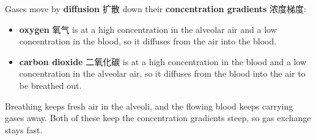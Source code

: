 \documentclass[11pt]{article}
\begin{document}
Gases move by \textbf{diffusion} 扩散 down their \textbf{concentration gradients} 浓度梯度:

\begin{itemize}
\item \textbf{oxygen} 氧气 is at a high concentration in the alveolar air and a low concentration in the blood, so it diffuses from the air into the blood.

\item \textbf{carbon dioxide} 二氧化碳 is at a high concentration in the blood and a low concentration in the alveolar air, so it diffuses from the blood into the air to be breathed out.

\end{itemize}

Breathing keeps fresh air in the alveoli, and the flowing blood keeps carrying gases away. Both of these keep the concentration gradients steep, so gas exchange stays fast.
\end{document}
